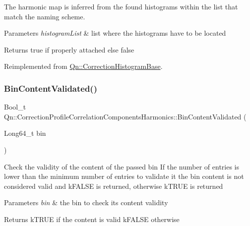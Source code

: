 The harmonic map is inferred from the found histograms within the list that match the naming scheme.


\begin{DoxyParams}{Parameters}
{\em histogram\+List} & list where the histograms have to be located \\
\hline
\end{DoxyParams}
\begin{DoxyReturn}{Returns}
true if properly attached else false 
\end{DoxyReturn}


Reimplemented from \mbox{\hyperlink{classQn_1_1CorrectionHistogramBase_ad8bcd0079fe5db561780a522e46b7b16}{Qn\+::\+Correction\+Histogram\+Base}}.

\mbox{\label{classQn_1_1CorrectionProfileCorrelationComponentsHarmonics_aed95bd8eea2e060ba3040d25f3533177}} 
\subsubsection{\texorpdfstring{Bin\+Content\+Validated()}{BinContentValidated()}}
{\footnotesize\ttfamily Bool\+\_\+t Qn\+::\+Correction\+Profile\+Correlation\+Components\+Harmonics\+::\+Bin\+Content\+Validated (\begin{DoxyParamCaption}\item[{Long64\+\_\+t}]{bin }\end{DoxyParamCaption})\hspace{0.3cm}{\ttfamily [virtual]}}

Check the validity of the content of the passed bin If the number of entries is lower than the minimum number of entries to validate it the bin content is not considered valid and k\+F\+A\+L\+SE is returned, otherwise k\+T\+R\+UE is returned 
\begin{DoxyParams}{Parameters}
{\em bin} & the bin to check its content validity \\
\hline
\end{DoxyParams}
\begin{DoxyReturn}{Returns}
k\+T\+R\+UE if the content is valid k\+F\+A\+L\+SE otherwise 
\end{DoxyReturn}


